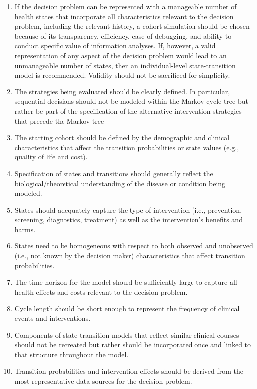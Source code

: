 \documentclass[
]{book}
\begin{document}
\begin{enumerate}
\def\labelenumi{\arabic{enumi}.}
\item
  If the decision problem can be represented with a manageable number of health states that incorporate all characteristics relevant to the decision problem, including the relevant history, a cohort simulation should be chosen because of its transparency, efficiency, ease of debugging, and ability to conduct specific value of information analyses. If, however, a valid representation of any aspect of the decision problem would lead to an unmanageable number of states, then an individual-level state-transition model is recommended. Validity should not be sacrificed for simplicity.
\item
  The strategies being evaluated should be clearly defined. In particular, sequential decisions should not be modeled within the Markov cycle tree but rather be part of the specification of the alternative intervention strategies that precede the Markov tree
\item
  The starting cohort should be defined by the demographic and clinical characteristics that affect the transition probabilities or state values (e.g., quality of life and cost).
\item
  Specification of states and transitions should generally reflect the biological/theoretical understanding of the disease or condition being modeled.
\item
  States should adequately capture the type of intervention (i.e., prevention, screening, diagnostics, treatment) as well as the intervention's benefits and harms.
\item
  States need to be homogeneous with respect to both observed and unobserved (i.e., not known by the decision maker) characteristics that affect transition probabilities.
\item
  The time horizon for the model should be sufficiently large to capture all health effects and costs relevant to the decision problem.
\item
  Cycle length should be short enough to represent the frequency of clinical events and interventions.
\item
  Components of state-transition models that reflect similar clinical courses should not be recreated but rather should be incorporated once and linked to that structure throughout the model.
\item
  Transition probabilities and intervention effects should be derived from the most representative data sources for the decision problem.

\end{enumerate}
\end{document}
